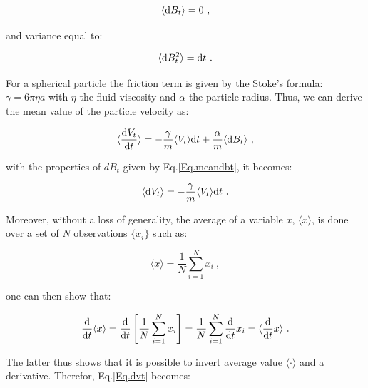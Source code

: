 \begin{equation}
	\langle \textnormal{d}B_t \rangle  = 0~,
	\label{Eq.meandbt}
\end{equation}

and variance equal to: 

\begin{equation}
	\langle \textnormal{d}B_t ^2 \rangle = \textnormal{d}t~.
	\label{Eq.meandbt2}
\end{equation}

For a spherical particle the friction term is given by the Stoke's formula: $\gamma = 6\pi \eta a$ with $\eta$ the fluid viscosity and $\alpha$ the particle radius. Thus, we can derive the mean value of the particle velocity as:


\begin{equation}
	\langle  \frac{ \textnormal{d}V_t}{\textnormal{d}t} \rangle = - \frac{\gamma}{m} \langle V_t \rangle \textnormal{d}t  + \frac{\alpha}{m} \langle  \textnormal{d}B_t \rangle ~,
	\label{Eq.langevinsd}
\end{equation}

with the properties of $dB_t$ given by Eq.\ref{Eq.meandbt}, it becomes:

\begin{equation}
	\langle  \textnormal{d}V_t \rangle = - \frac{\gamma}{m} \langle V_t \rangle \textnormal{d}t ~.
	\label{Eq.dvt}
\end{equation}

Moreover, without a loss of generality, the average of a variable $x$, $\langle x \rangle$, is done over a set of $N$ observations $\{x_i\}$ such as:

\begin{equation}
	\langle x \rangle = \frac{1}{N} \sum _{i=1}^N x_i ~,
\end{equation}

one can then show that:

\begin{equation}
	\frac{\textnormal{d}}{\textnormal{d}t}\langle x \rangle = \frac{\textnormal{d}}{ \textnormal{d}t} \left[\frac{1}{N} \sum _{i=1}^N x_i \right] = 
	 \frac{1}{N} \sum _{i=1}^N \frac{\textnormal{d}}{ \textnormal{d}t} x_i = \langle\frac{\textnormal{d}}{\textnormal{d}t} x \rangle ~.
\end{equation}

The latter thus shows that it is possible to invert average value $\langle \cdot \rangle$ and a derivative. Therefor, Eq.\ref{Eq.dvt} becomes:

